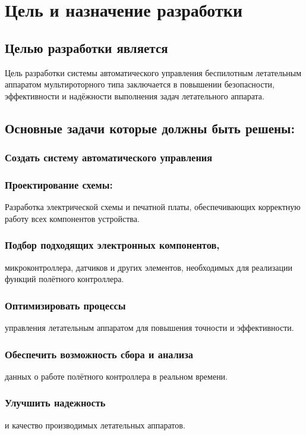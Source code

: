 \documentclass[a4paper]{bsuir-tor}
\begin{document}
  \section{Цель и назначение разработки}
  \subsection{Целью разработки является }
  Цель разработки системы автоматического управления беспилотным
  летательным аппаратом мультироторного типа заключается в повышении
  безопасности, эффективности и надёжности выполнения задач
  летательного аппарата.
  

  \subsection{Основные задачи которые должны быть решены: }
  
  \subsubsection{Создать систему автоматического управления}

  \subsubsection{Проектирование схемы: }
  Разработка электрической схемы и печатной платы, обеспечивающих
  корректную работу всех компонентов устройства.

  \subsubsection{Подбор подходящих электронных компонентов, }
  микроконтроллера, датчиков и других элементов, необходимых для
  реализации функций полётного контроллера.

  \subsubsection{Оптимизировать процессы}
  управления летательным аппаратом для повышения точности и
  эффективности.
  
  \subsubsection{Обеспечить возможность сбора и анализа}
  данных о работе полётного контроллера в реальном времени.

  \subsubsection{Улучшить надежность}
  и качество производимых летательных аппаратов.
\end{document}
